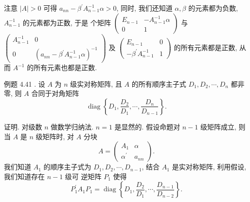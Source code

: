 \documentclass{article}
\begin{document}
注意 $|A|>0$ 可得 $a_{n n}-\beta^{\prime} A_{n-1}^{-1} \alpha>0$, 同时, 我们还知道 $\alpha, \beta$ 的元素都为负数, $A_{n-1}^{-1}$ 的元素都为正数, 于是 个矩阵 $\left(\begin{array}{cc}E_{n-1} & -A_{n-1}^{-1} \alpha \\ 0 & 1\end{array}\right)$ 与 $\left(\begin{array}{cc}A_{n-1}^{-1} & 0 \\ 0 & \left(a_{n n}-\beta^{\prime} A_{n-1}^{-1} \alpha\right)^{-1}\end{array}\right)$ 及 $\left(\begin{array}{cc}E_{n-1} & 0 \\ -\beta^{\prime} A_{n-1}^{-1} & 1\end{array}\right)$ 的所有元素都是正数, 从而 $A^{-1}$ 的所有元素也都是正数.

\vspace{1ex}
{\heiti 例题 4.41 . } {\kaishu 设 $A$ 为 $n$ 级实对称矩阵, 且 $A$ 的所有顺序主子式 $D_{1}, D_{2}, \cdots, D_{n}$ 都非零, 则 $A$ 合同于对角矩阵}
\begin{equation*}
    \operatorname{diag}\left\{D_{1}, \frac{D_{2}}{D_{1}}, \cdots, \frac{D_{n}}{D_{n-1}}\right\}.
\end{equation*}

{\heiti 证明.} 对级数 $n$ 做数学归纳法. $n=1$ 是显然的. 假设命题对 $n-1$ 级矩阵成立, 则当 $A$ 是 $n$ 级矩阵时,
对 $A$ 分块
\begin{equation*}
    A=\left(\begin{array}{cc}
        A_{1}           & \alpha  \\
        \alpha^{\prime} & a_{n n}
    \end{array}\right).
\end{equation*}
我们知道 $A_{1}$ 的顺序主子式为 $D_{1}, D_{2}, \cdots, D_{n-1}$, 结合 $A_{1}$ 是实对称矩阵, 利用假设, 我们知道存在 $n-1$ 级可
逆矩阵 $P_{1}$ 使得
\begin{equation*}
    P_{1}^{\prime} A_{1} P_{1}=\operatorname{diag}\left\{D_{1}, \frac{D_{2}}{D_{1}}, \cdots, \frac{D_{n-1}}{D_{n-2}}\right\}.
\end{equation*}
\end{document}

